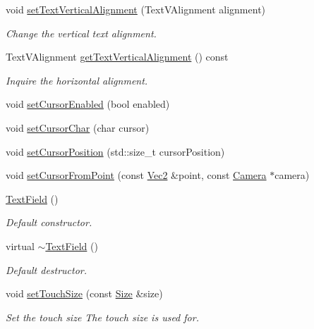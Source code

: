 \begin{DoxyCompactItemize}
void \hyperlink{classui_1_1TextField_a05d3b9f37bbffee99ec903ef59ebca56}{set\+Text\+Vertical\+Alignment} (Text\+V\+Alignment alignment)
\begin{DoxyCompactList}\small\item\em Change the vertical text alignment. \end{DoxyCompactList}\item 
Text\+V\+Alignment \hyperlink{classui_1_1TextField_a79228941a990932f6af8d07268f5a5e7}{get\+Text\+Vertical\+Alignment} () const
\begin{DoxyCompactList}\small\item\em Inquire the horizontal alignment. \end{DoxyCompactList}\item 
void \hyperlink{classui_1_1TextField_acfbd7a912c166c1de933081466976f15}{set\+Cursor\+Enabled} (bool enabled)
\item 
void \hyperlink{classui_1_1TextField_a27149c6499b7651ad4f1fca8211fda1e}{set\+Cursor\+Char} (char cursor)
\item 
void \hyperlink{classui_1_1TextField_a04e48a8fd94ac2015cdaafe73ca62c76}{set\+Cursor\+Position} (std\+::size\+\_\+t cursor\+Position)
\item 
void \hyperlink{classui_1_1TextField_a130ef17d3dda676d98b28e46f1d1f253}{set\+Cursor\+From\+Point} (const \hyperlink{classVec2}{Vec2} \&point, const \hyperlink{classCamera}{Camera} $\ast$camera)
\item 
\mbox{\label{classui_1_1TextField_a86857eda71fe81dd1fd13c48d20e1662}} 
\hyperlink{classui_1_1TextField_a86857eda71fe81dd1fd13c48d20e1662}{Text\+Field} ()
\begin{DoxyCompactList}\small\item\em Default constructor. \end{DoxyCompactList}\item 
\mbox{\label{classui_1_1TextField_a47e8636e311039331f46a8610b459076}} 
virtual \hyperlink{classui_1_1TextField_a47e8636e311039331f46a8610b459076}{$\sim$\+Text\+Field} ()
\begin{DoxyCompactList}\small\item\em Default destructor. \end{DoxyCompactList}\item 
void \hyperlink{classui_1_1TextField_a3d221174c8a03b9a6c4fc90d1a1b8707}{set\+Touch\+Size} (const \hyperlink{classSize}{Size} \&size)
\begin{DoxyCompactList}\small\item\em Set the touch size The touch size is used for. \end{DoxyCompactList}\item 

\end{DoxyCompactItemize}
